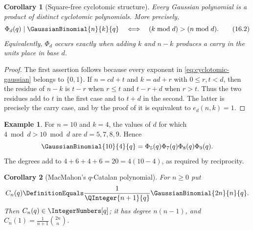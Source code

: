 \documentclass[11pt,a4paper,oneside,openany]{book}
\newtheorem{corollary}[corollary]{Corollary}
\theoremstyle{definition}
\newtheorem{example}[example]{Example}
\theoremstyle{remark}
\begin{document}
\begin{corollary}[Square-free cyclotomic structure]\label{cor:squarefree-cyclotomic}
Every Gaussian polynomial is a product of distinct cyclotomic polynomials.  More precisely,
\[
 \Phi_d(q)\mid\GaussianBinomial{n}{k}{q}
 \quad\Longleftrightarrow\quad
 (k\bmod d)> (n\bmod d).
 \tag{16.2}\label{eq:carry-criterion}
\]
Equivalently, $\Phi_d$ occurs exactly when adding $k$ and $n-k$ produces a carry in the units place in base $d$.
\end{corollary}

\begin{proof}
The first assertion follows because every exponent in \eqref{eq:cyclotomic-gaussian} belongs to $\{0,1\}$.  If $n=cd+t$ and $k=ad+r$ with $0\le r,t<d$, then the residue of $n-k$ is $t-r$ when $r\le t$ and $t-r+d$ when $r>t$.  Thus the two residues add to $t$ in the first case and to $t+d$ in the second.  The latter is precisely the carry case, and by the proof of  it is equivalent to $e_d(n,k)=1$.
\end{proof}

\begin{example}
For $n=10$ and $k=4$, the values of $d$ for which $4\bmod d>10\bmod d$ are $d=5,7,8,9$.  Hence
\[
 \GaussianBinomial{10}{4}{q}=\Phi_5(q)\Phi_7(q)\Phi_8(q)\Phi_9(q).
\]
The degrees add to $4+6+4+6=20=4(10-4)$, as required by reciprocity.
\end{example}

\begin{corollary}[MacMahon's $q$-Catalan polynomial]\label{cor:q-catalan}
For $n\ge0$ put
\[
 C_n(q)\DefinitionEquals\frac1{\QInteger{n+1}{q}}\GaussianBinomial{2n}{n}{q}.
\]
Then $C_n(q)\in\IntegerNumbers[q]$; it has degree $n(n-1)$, and $C_n(1)=\frac1{n+1}\binom{2n}{n}$.
\end{corollary}
\end{document}
